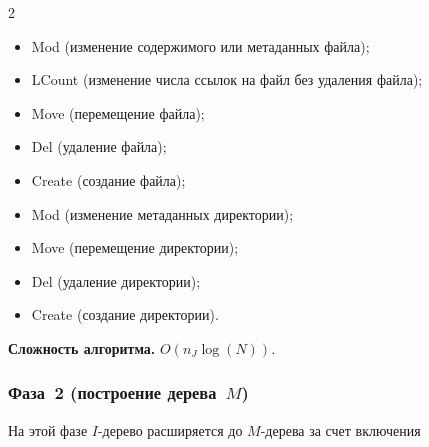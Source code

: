\begin{multicols}{2}
\begin{itemize}


\item Mod (изменение содержимого или метаданных файла);\\[-15pt]


\item  LCount (изменение числа ссылок на файл без удаления файла);\\[-15pt]


\item  Move (перемещение файла);\\[-15pt]


\item  Del (удаление файла);\\[-15pt]


\item  Create (создание файла);\\[-15pt]


\item  Mod (изменение метаданных директории);\\[-15pt]


\item  Move (перемещение директории);\\[-15pt]


\item  Del (удаление директории);\\[-15pt]


\item  Create (создание директории).


\end{itemize}





      \smallskip





      \noindent


      \textbf{Сложность алгоритма.} $O(n_J \log (N))$.





\subsubsection{Фаза~2 (построение дерева~$M$)} %





      На этой фазе $I$-дерево расширяется до $M$-дерева за счет включения 



\end{multicols}
